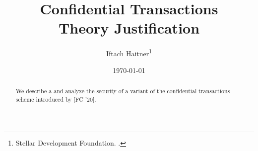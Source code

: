 \documentclass[11pt]{article}
\title{Confidential Transactions  \\ Theory Justification}
\author{Iftach Haitner\thanks{Stellar Development Foundation. \email{ iftach.haitner@stellar.org}.}}
\date{\today}
\begin{document}
 
 \sloppy
 
  
\maketitle


\begin{abstract}
We describe a and analyze the security of  a variant of the confidential transactions   scheme introduced by  \citeauthor {BunzAZB20} [FC '20]. 
\end{abstract}

\tableofcontents
\newpage 







%

\printbibliography





%

%
\end{document}
